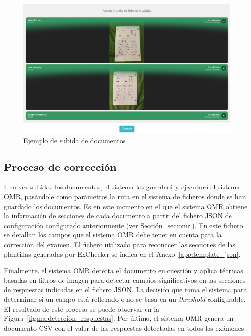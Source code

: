 \documentclass[a4paper, 12pt]{book}
\begin{document}
\begin{figure}
  \centering
  \includegraphics[width=12cm, keepaspectratio]{img/subida_documentos}
  \caption{Ejemplo de subida de documentos}
  \label{figura:subida_documentos}
\end{figure}

\subsection{Proceso de corrección}
\label{subsec:proceso_correccion}

Una vez subidos los documentos, el sistema los guardará y ejecutará el sistema OMR,
pasándole como parámetros la ruta en el sistema de ficheros donde se han guardado
los documentos. Es en este momento en el que el sistema OMR obtiene la información
de secciones de cada documento a partir del fichero JSON de configuración configurado
anteriormente (ver Sección~\ref{sec:omr}). En este fichero se detallan los campos
que el sistema OMR debe tener en cuenta para la corrección del examen. El fichero
utilizado para reconocer las secciones de las plantillas generadas por ExChecker
se indica en el Anexo~\ref{app:template_json}.

Finalmente, el sistema OMR detecta el documento en cuestión y aplica técnicas basadas
en filtros de imagen para detectar cambios significativos en las secciones de respuestas
indicadas en el fichero JSON. La decisión que toma el sistema para determinar si un campo está rellenado
o no se basa en un \textit{threshold} configurable. El resultado de este proceso
se puede observar en la Figura~\ref{figura:deteccion_respuestas}. Por último, el sistema OMR genera un
documento CSV con el valor de las respuestas detectadas en todos los exámenes.
\end{document}

